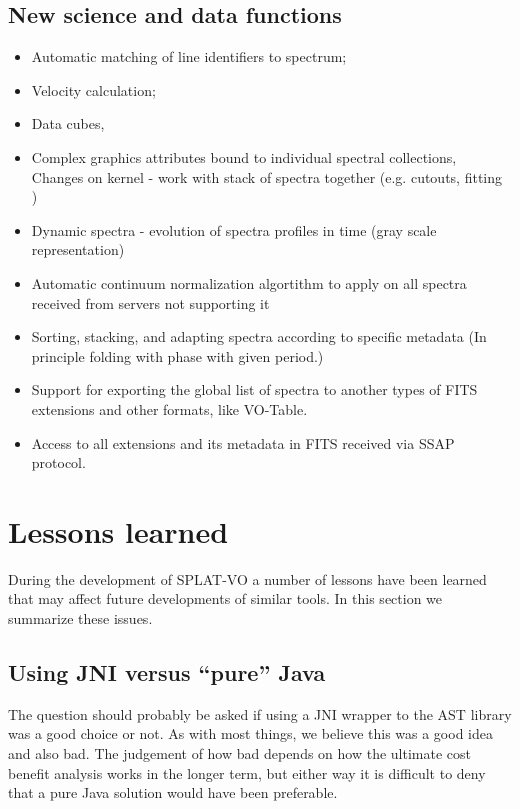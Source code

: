 \documentclass[final,authoryear,5p,times,twocolumn]{elsarticle}
\begin{document}
\subsection{New science and data functions}
\begin{itemize}
\item Automatic matching of line identifiers to spectrum;
\item	Velocity calculation;
\item Data cubes,
\item Complex graphics attributes bound to individual spectral collections, Changes on kernel - work with stack of spectra together (e.g. cutouts, fitting )
\item Dynamic spectra - evolution of spectra profiles in time (gray scale representation)
\item Automatic continuum normalization algortithm to apply on all spectra received from servers not supporting it
\item Sorting, stacking, and adapting spectra according to specific metadata (In principle folding with phase with given period.)
\item Support for exporting the global list of spectra to another types of FITS extensions and other formats, like VO-Table.
\item Access to all extensions and its metadata in FITS received via SSAP protocol. 

\end{itemize}

\section{Lessons learned}

During the development of SPLAT-VO a number of lessons have been
learned that may affect future developments of similar tools. In this
section we summarize these issues.

\subsection{Using JNI versus ``pure'' Java}

The question should probably be asked if using a JNI wrapper to the
AST library was a good choice or not. As with most things, we believe
this was a good idea and also bad. The judgement of how bad depends on
how the ultimate cost benefit analysis works in the longer term, but
either way it is difficult to deny that a pure Java solution would
have been preferable.
\end{document}
